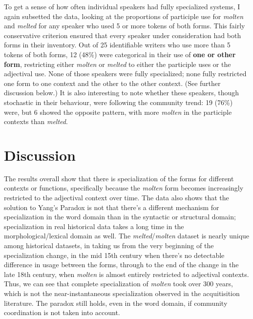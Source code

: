 \documentclass{artikel3}
\begin{document}
To get a sense of how often individual speakers had fully specialized systems, I again subsetted the data, looking at the proportions of participle use for \textsl{molten} and \textsl{melted} for any speaker who used 5 or more tokens of both forms. This fairly conservative criterion ensured that every speaker under consideration had both forms in their inventory. Out of 25 identifiable writers who use more than 5 tokens of both forms, 12 (48\%) were categorical in their use of \textbf{one or other form}, restricting either \textsl{molten} or \textsl{melted} to either the participle uses or the adjectival use. None of those speakers were fully specialized; none fully restricted one form to one context and the other to the other context. (See further discussion below.) It is also interesting to note whether these speakers, though stochastic in their behaviour, were following the community trend: 19 (76\%) were, but 6 showed the opposite pattern, with more \textsl{molten} in the participle contexts than \textsl{melted}.




\section{Discussion}
\label{discuss}

The results overall show that there is specialization of the forms for different contexts or functions, specifically because the \textsl{molten} form becomes increasingly restricted to the adjectival context over time. The data also shows that the solution to Yang's Paradox is not that there's a different mechanism for specialization in the word domain than in the syntactic or structural domain; specialization in real historical data takes a long time in the morphological/lexical domain as well. The \textsl{melted}/\textsl{molten} dataset is nearly unique among historical datasets, in taking us from the very beginning of the specialization change, in the mid 15th century when there's no detectable difference in usage between the forms, through to the end of the change in the late 18th century, when \textsl{molten} is almost entirely restricted to adjectival contexts. Thus, we can see that complete specialization of \textsl{molten} took over 300 years, which is not the near-instantaneous specialization observed in the acquitisition literature. The paradox still holds, even in the word domain, if community coordination is not taken into account.
\end{document}
